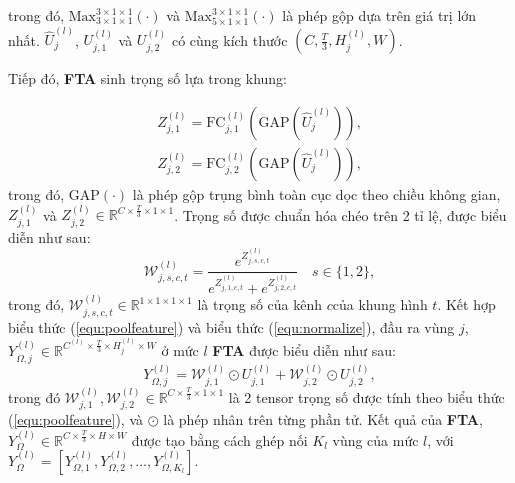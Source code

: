 trong đó, $\text{Max}_{3 \times 1 \times 1}^{3\times 1 \times 1}\left(\cdot\right)$ và $\text{Max}_{5 \times 1 \times 1}^{3\times 1 \times 1}\left(\cdot\right)$ là phép gộp dựa trên giá trị lớn nhất. $\hat{U}_{j}^{(l)}$, $U_{j,1}^{(l)}$ và $U_{j,2}^{(l)}$ có cùng kích thước $(C,\frac{T}{3},H_j^{(l)},W)$.

Tiếp đó, \textbf{FTA} sinh trọng số lựa trong khung:

\begin{equation}
  \begin{gathered}
    Z_{j,1}^{(l)}=\text{FC}_{j,1}^{(l)}\left(\text{GAP}\left(\hat{U}_j^{(l)}\right)\right),\\
    Z_{j,2}^{(l)}=\text{FC}_{j,2}^{(l)}\left(\text{GAP}\left(\hat{U}_j^{(l)}\right)\right),
  \end{gathered}
  \label{equ:weight}
\end{equation}
trong đó, $\text{GAP}\left(\cdot\right)$  là phép gộp trụng bình toàn cục dọc theo chiều không gian, $Z_{j,1}^{(l)}$ và $ Z_{j,2}^{(l)} \in \mathbb{R}^{C  \times \frac{T}{3} \times 1 \times 1}$. Trọng số được chuẩn hóa chéo trên 2 tỉ lệ, được biểu diễn như sau:
\begin{equation}
  \label{equ:normalize}
  \mathcal{W}_{j,s,c,t}^{(l)}=\frac{e^{Z_{j,s,c,t}^{(l)}}}{e^{Z_{j,1,c,t}^{(l)}}+e^{Z_{j,2,c,t}^{(l)}}}   \quad s\in \{1,2\},
\end{equation}
trong đó, $\mathcal{W}_{j,s,c,t}^{(l)} \in \mathbb{R}^{1 \times 1 \times 1 \times 1}$ là trọng số của kênh $c$của khung hình $t$.
Kết hợp biểu thức (\ref{equ:poolfeature}) và biểu thức (\ref{equ:normalize}), đầu ra vùng $j$, $Y_{\Omega,j}^{(l)} \in \mathbb{R}^{C^{(l)} \times \frac{T}{3} \times H_j^{(l)} \times W}$ ở mức $l$ \textbf{FTA} được biểu diễn như sau:
\begin{equation}
  Y_{\Omega,j}^{(l)}=\mathcal{W}_{j,1}^{(l)}\odot U_{j,1}^{(l)}+\mathcal{W}_{j,2}^{(l)}\odot U_{j,2}^{(l)},
\end{equation}
trong đó $\mathcal{W}_{j,1}^{(l)}, \mathcal{W}_{j,2}^{(l)} \in \mathbb{R}^{C \times \frac{T}{3} \times 1 \times 1}$ là 2 tensor trọng số được  tính theo biểu thức (\ref{equ:poolfeature}), và $\odot$ là phép nhân trên từng phần tử. Kết quả của \textbf{FTA}, $Y^{(l)}_{\Omega}\in \mathbb{R}^{C \times \frac{T}{3} \times H \times W}$ được tạo bằng cách ghép nối $K_l$ vùng của mức $l$, với $Y^{(l)}_{\Omega}=\left[Y_{\Omega,1}^{(l)},Y_{\Omega,2}^{(l)},\ldots,Y_{\Omega,K_l}^{(l)}\right]$.



